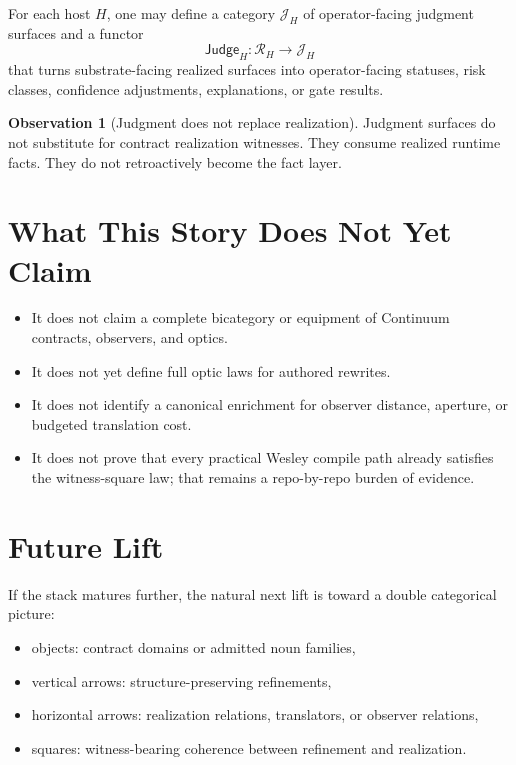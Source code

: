 \documentclass[11pt]{article}
\newcommand{\RHost}[1]{\mathcal{R}_{#1}}
\newcommand{\Judge}{\mathsf{Judge}}
\theoremstyle{definition}
\newtheorem{observation}{Observation}
\begin{document}
For each host $H$, one may define a category $\mathcal{J}_H$ of
operator-facing judgment surfaces and a functor
\[
\Judge_H : \RHost{H} \to \mathcal{J}_H
\]
that turns substrate-facing realized surfaces into operator-facing statuses,
risk classes, confidence adjustments, explanations, or gate results.

\begin{observation}[Judgment does not replace realization]
Judgment surfaces do not substitute for contract realization witnesses. They
consume realized runtime facts. They do not retroactively become the fact
layer.
\end{observation}

\section{What This Story Does Not Yet Claim}

\begin{itemize}[leftmargin=2em]
\item It does not claim a complete bicategory or equipment of Continuum
  contracts, observers, and optics.
\item It does not yet define full optic laws for authored rewrites.
\item It does not identify a canonical enrichment for observer distance,
  aperture, or budgeted translation cost.
\item It does not prove that every practical Wesley compile path already
  satisfies the witness-square law; that remains a repo-by-repo burden of
  evidence.
\end{itemize}

\section{Future Lift}

If the stack matures further, the natural next lift is toward a double
categorical picture:
\begin{itemize}[leftmargin=2em]
\item objects: contract domains or admitted noun families,
\item vertical arrows: structure-preserving refinements,
\item horizontal arrows: realization relations, translators, or observer
  relations,
\item squares: witness-bearing coherence between refinement and realization.
\end{itemize}
\end{document}

